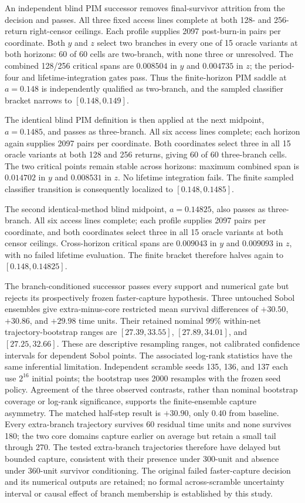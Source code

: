 An independent blind PIM successor removes final-survivor attrition from the
decision and passes.  All three fixed access lines complete at both 128- and
256-return right-censor ceilings.  Each profile supplies 2097 post-burn-in
pairs per coordinate.  Both $y$ and $z$ select two branches in every one of 15
oracle variants at both horizons: 60 of 60 cells are two-branch, with none
three or unresolved.  The combined 128/256 critical spans are $0.008504$ in
$y$ and $0.004735$ in $z$; the period-four and lifetime-integration gates pass.
Thus the finite-horizon PIM saddle at $a=0.148$ is independently qualified as
two-branch, and the sampled classifier bracket narrows to $[0.148,0.149]$.

The identical blind PIM definition is then applied at the next midpoint,
$a=0.1485$, and passes as three-branch.  All six access lines complete; each
horizon again supplies 2097 pairs per coordinate.  Both coordinates select
three in all 15 oracle variants at both 128 and 256 returns, giving 60 of 60
three-branch cells.  The two critical points remain stable across horizons:
maximum combined span is $0.014702$ in $y$ and $0.008531$ in $z$.  No lifetime
integration fails.  The finite sampled classifier transition is consequently
localized to $[0.148,0.1485]$.

The second identical-method blind midpoint, $a=0.14825$, also passes as
three-branch.  All six access lines complete; each profile supplies 2097 pairs
per coordinate, and both coordinates select three in all 15 oracle variants at
both censor ceilings.  Cross-horizon critical spans are $0.009043$ in $y$ and
$0.009093$ in $z$, with no failed lifetime evaluation.  The finite bracket
therefore halves again to $[0.148,0.14825]$.

The branch-conditioned successor passes every support and numerical gate but
rejects its prospectively frozen faster-capture hypothesis.  Three untouched
Sobol ensembles give extra-minus-core restricted mean survival differences of
$+30.50$, $+30.86$, and $+29.98$ time units. Their retained nominal 99\%
within-net trajectory-bootstrap ranges are $[27.39,33.55]$, $[27.89,34.01]$,
and $[27.25,32.66]$. These are descriptive resampling ranges, not calibrated
confidence intervals for dependent Sobol points. The associated log-rank
statistics have the same inferential limitation. Independent scramble seeds
135, 136, and 137 each use $2^{16}$ initial points; the bootstrap uses 2000
resamples with the frozen seed policy. Agreement of the three observed
contrasts, rather than nominal bootstrap coverage or log-rank significance,
supports the finite-ensemble capture asymmetry.
The matched half-step result is $+30.90$, only $0.40$ from baseline.  Every
extra-branch trajectory survives 60 residual time units and none survives 180;
the two core domains capture earlier on average but retain a small tail through
270. The tested extra-branch trajectories therefore have delayed but bounded
capture, consistent with their presence under 300-unit and absence under
360-unit survivor conditioning. The original failed faster-capture decision
and its numerical outputs are retained; no formal across-scramble uncertainty
interval or causal effect of branch membership is established by this study.

